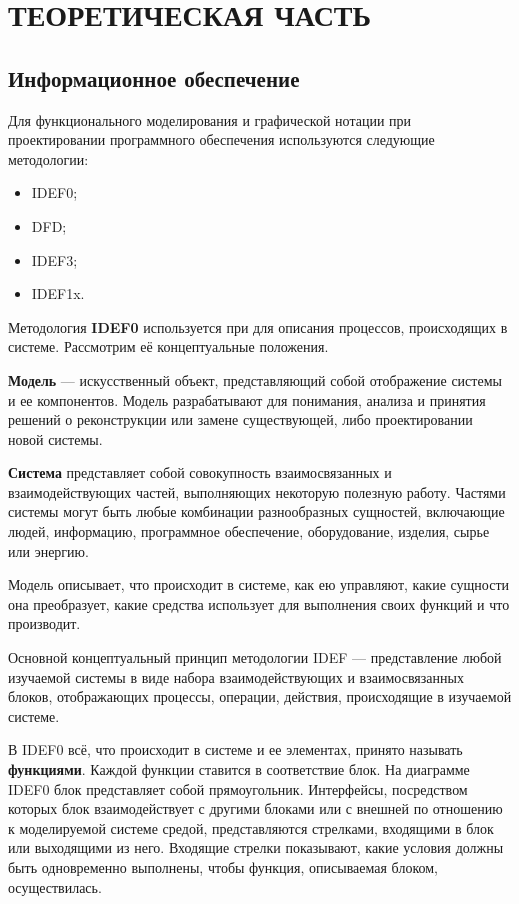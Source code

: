 \section[Теоретическая часть]{ТЕОРЕТИЧЕСКАЯ ЧАСТЬ}

\subsection{Информационное обеспечение}

Для функционального моделирования и графической нотации при проектировании
программного обеспечения используются следующие методологии:
\begin{itemize}
  \item IDEF0;
  \item DFD;
  \item IDEF3;
  \item IDEF1x.
\end{itemize}

Методология \textbf{IDEF0} используется при для описания процессов,
происходящих в системе. Рассмотрим её концептуальные положения.

\textbf{Модель} --- искусственный объект, представляющий собой отображение
системы и ее компонентов. Модель разрабатывают для понимания, анализа и принятия
решений о реконструкции или замене существующей, либо
проектировании новой системы.

\textbf{Система} представляет собой совокупность
взаимосвязанных и взаимодействующих частей, выполняющих некоторую
полезную работу. Частями системы могут быть любые
комбинации разнообразных сущностей, включающие людей, информацию,
программное обеспечение, оборудование, изделия, сырье или энергию.

Модель описывает, что происходит в системе, как ею
управляют, какие сущности она преобразует, какие средства использует для
выполнения своих функций и что производит.

Основной концептуальный принцип методологии IDEF --- представление любой
изучаемой системы в виде набора взаимодействующих и взаимосвязанных
блоков, отображающих процессы, операции, действия,
происходящие в изучаемой системе.

В IDEF0 всё, что происходит в системе и ее элементах, принято называть
\textbf{функциями}. Каждой функции ставится в соответствие блок.
На диаграмме IDEF0 блок представляет собой прямоугольник.
Интерфейсы, посредством которых блок взаимодействует с другими блоками
или с внешней по отношению к моделируемой системе средой,
представляются стрелками, входящими в блок или выходящими из него.
Входящие стрелки показывают, какие условия должны быть одновременно
выполнены, чтобы функция, описываемая блоком, осуществилась.

